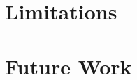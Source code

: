 \section{Limitations}
\label{evaluation:limitations}

\section{Future Work}
\label{evaluation:future}

